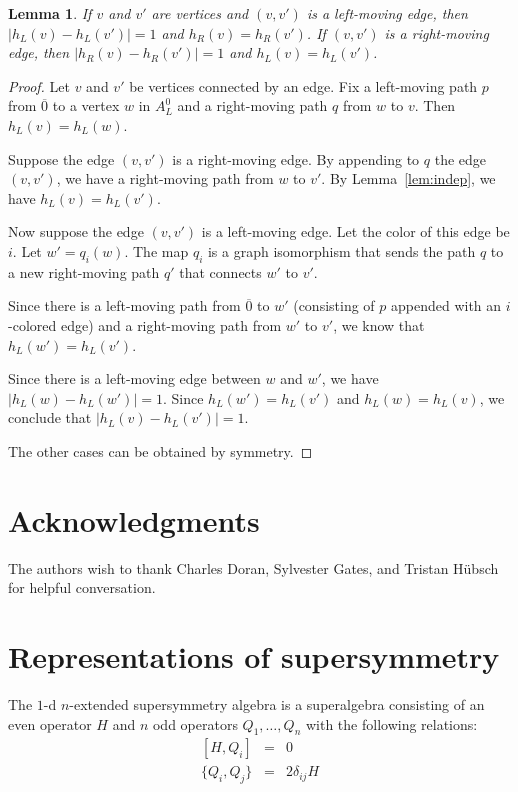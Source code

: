 \documentclass[12pt,twoside,singlespace]{article}
\numberwithin{equation}{section}
\newtheorem{lem}[equation]{Lemma}
\theoremstyle{definition}
\begin{document}
\begin{lem}
If $v$ and $v'$ are vertices and $(v,v')$ is a left-moving edge, then
$|h_L(v)-h_L(v')|=1$ and $h_R(v)=h_R(v')$.  If $(v,v')$ is a right-moving edge, then $|h_R(v)-h_R(v')|=1$ and $h_L(v)=h_L(v')$.
\end{lem}

\begin{proof}
Let $v$ and $v'$ be vertices connected by an edge.  Fix a left-moving path $p$ from $\overline{0}$ to a vertex $w$ in $A_L^0$ and a right-moving path $q$ from $w$ to $v$.  Then $h_L(v)=h_L(w)$.

Suppose the edge $(v,v')$ is a right-moving edge.  By appending to $q$ the edge $(v,v')$, we have a right-moving path from $w$ to $v'$.  By Lemma~\ref{lem:indep}, we have $h_L(v)=h_L(v')$.

Now suppose the edge $(v,v')$ is a left-moving edge.  Let the color of this edge be $i$.  Let $w'=q_i(w)$.  The map $q_i$ is a graph isomorphism that sends the path $q$ to a new right-moving path $q'$ that connects $w'$ to $v'$.

Since there is a left-moving path from $\overline{0}$ to $w'$ (consisting of $p$ appended with an $i$-colored edge) and a right-moving path from $w'$ to $v'$, we know that $h_L(w')=h_L(v')$.  

Since there is a left-moving edge between $w$ and $w'$, we have $|h_L(w)-h_L(w')|=1$.  Since $h_L(w')=h_L(v')$ and $h_L(w)=h_L(v)$, we conclude that $|h_L(v)-h_L(v')|=1$.

The other cases can be obtained by symmetry.
\end{proof}



\section*{Acknowledgments}

The authors wish to thank Charles Doran, Sylvester Gates, and Tristan H\"ubsch for helpful conversation.

\appendix

\section{Representations of supersymmetry}
The $1$-d $n$-extended supersymmetry algebra is a superalgebra consisting of an even operator $H$ and $n$ odd operators $Q_1, \ldots, Q_n$ with the following relations:
\begin{eqnarray}
\label{eqn:susy1d1}
[H,Q_i]&=&0\\
\label{eqn:susy1d2}
\{Q_i,Q_j\}&=&2\delta_{ij}H
\end{eqnarray}
\end{document}
